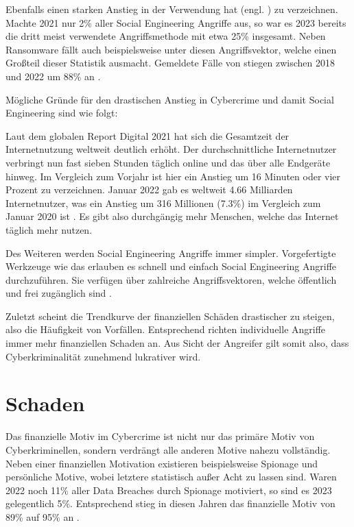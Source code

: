 Ebenfalls einen starken Anstieg in der Verwendung hat  (engl. ) zu verzeichnen.
Machte  2021 nur 2\% aller Social Engineering Angriffe aus, so war es 2023 bereits die dritt meist verwendete Angriffsmethode mit etwa 25\% insgesamt.
Neben Ransomware fällt auch beispielsweise  unter diesen Angriffsvektor, welche einen Großteil dieser Statistik ausmacht.
Gemeldete Fälle von  stiegen zwischen 2018 und 2022 um 88\% an .

Mögliche Gründe für den drastischen Anstieg in Cybercrime und damit Social Engineering sind wie folgt:

Laut dem globalen Report Digital 2021 hat sich die Gesamtzeit der Internetnutzung weltweit deutlich erhöht.
Der durchschnittliche Internetnutzer verbringt nun fast sieben Stunden täglich online und das über alle Endgeräte hinweg.
Im Vergleich zum Vorjahr ist hier ein Anstieg um 16 Minuten oder vier Prozent zu verzeichnen.
Januar 2022 gab es weltweit 4.66 Milliarden Internetnutzer, was ein Anstieg um 316 Millionen (7.3\%) im Vergleich zum Januar 2020 ist .
Es gibt also durchgängig mehr Menschen, welche das Internet täglich mehr nutzen.

Des Weiteren werden Social Engineering Angriffe immer simpler.
Vorgefertigte Werkzeuge wie das  erlauben es schnell und einfach Social Engineering Angriffe durchzuführen.
Sie verfügen über zahlreiche Angriffsvektoren, welche öffentlich und frei zugänglich sind .

Zuletzt scheint die Trendkurve der finanziellen Schäden drastischer zu steigen, also die Häufigkeit von Vorfällen.
Entsprechend richten individuelle Angriffe immer mehr finanziellen Schaden an.
Aus Sicht der Angreifer gilt somit also, dass Cyberkriminalität zunehmend lukrativer wird.

\section{Schaden}

Das finanzielle Motiv im Cybercrime ist nicht nur das primäre Motiv von Cyberkriminellen, sondern verdrängt alle anderen Motive nahezu vollständig.
Neben einer finanziellen Motivation existieren beispielsweise Spionage und persönliche Motive, wobei letztere statistisch außer Acht zu lassen sind.
Waren 2022 noch 11\% aller Data Breaches durch Spionage motiviert, so sind es 2023 gelegentlich 5\%.
Entsprechend stieg in diesen Jahren das finanzielle Motiv von 89\% auf 95\% an .

